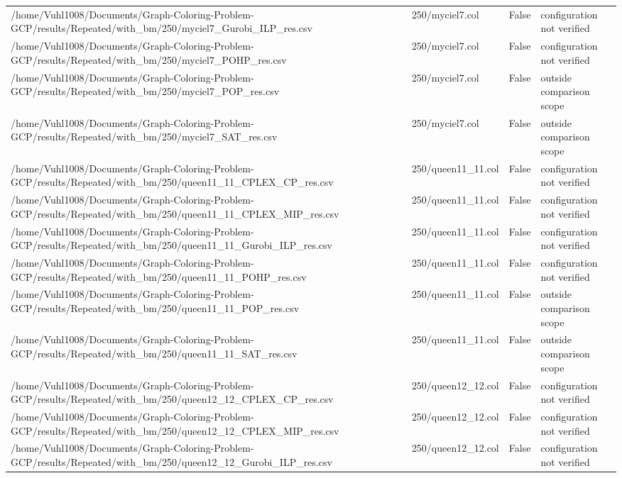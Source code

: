 \begin{table}[htbp]
\begin{tabular}{llll}
/home/Vuhl1008/Documents/Graph-Coloring-Problem-GCP/results/Repeated/with\_bm/250/myciel7\_Gurobi\_ILP\_res.csv & 250/myciel7.col & False & configuration not verified \\
/home/Vuhl1008/Documents/Graph-Coloring-Problem-GCP/results/Repeated/with\_bm/250/myciel7\_POHP\_res.csv & 250/myciel7.col & False & configuration not verified \\
/home/Vuhl1008/Documents/Graph-Coloring-Problem-GCP/results/Repeated/with\_bm/250/myciel7\_POP\_res.csv & 250/myciel7.col & False & outside comparison scope \\
/home/Vuhl1008/Documents/Graph-Coloring-Problem-GCP/results/Repeated/with\_bm/250/myciel7\_SAT\_res.csv & 250/myciel7.col & False & outside comparison scope \\
/home/Vuhl1008/Documents/Graph-Coloring-Problem-GCP/results/Repeated/with\_bm/250/queen11\_11\_CPLEX\_CP\_res.csv & 250/queen11\_11.col & False & configuration not verified \\
/home/Vuhl1008/Documents/Graph-Coloring-Problem-GCP/results/Repeated/with\_bm/250/queen11\_11\_CPLEX\_MIP\_res.csv & 250/queen11\_11.col & False & configuration not verified \\
/home/Vuhl1008/Documents/Graph-Coloring-Problem-GCP/results/Repeated/with\_bm/250/queen11\_11\_Gurobi\_ILP\_res.csv & 250/queen11\_11.col & False & configuration not verified \\
/home/Vuhl1008/Documents/Graph-Coloring-Problem-GCP/results/Repeated/with\_bm/250/queen11\_11\_POHP\_res.csv & 250/queen11\_11.col & False & configuration not verified \\
/home/Vuhl1008/Documents/Graph-Coloring-Problem-GCP/results/Repeated/with\_bm/250/queen11\_11\_POP\_res.csv & 250/queen11\_11.col & False & outside comparison scope \\
/home/Vuhl1008/Documents/Graph-Coloring-Problem-GCP/results/Repeated/with\_bm/250/queen11\_11\_SAT\_res.csv & 250/queen11\_11.col & False & outside comparison scope \\
/home/Vuhl1008/Documents/Graph-Coloring-Problem-GCP/results/Repeated/with\_bm/250/queen12\_12\_CPLEX\_CP\_res.csv & 250/queen12\_12.col & False & configuration not verified \\
/home/Vuhl1008/Documents/Graph-Coloring-Problem-GCP/results/Repeated/with\_bm/250/queen12\_12\_CPLEX\_MIP\_res.csv & 250/queen12\_12.col & False & configuration not verified \\
/home/Vuhl1008/Documents/Graph-Coloring-Problem-GCP/results/Repeated/with\_bm/250/queen12\_12\_Gurobi\_ILP\_res.csv & 250/queen12\_12.col & False & configuration not verified \\

\end{tabular}
\end{table}
